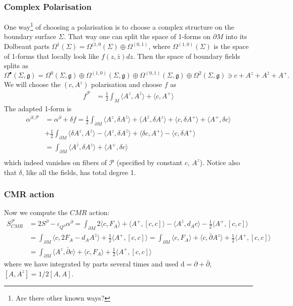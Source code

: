 \documentclass[a4paper,reqno]{amsart}
\newcommand{\g}{\mathfrak{g}}
\newcommand{\calP}{\mathcal{P}}
\newcommand{\de}{\partial}
\newcommand{\dr}{\mathrm{d}}
\begin{document}
\subsubsection{Complex Polarisation}
One way\footnote{Are there other known ways?} of choosing a polarisation is to choose a complex structure on the boundary surface $\Sigma $. That way one can split the space of 1-forms on $\de M$ into its Dolbeaut parts $\Omega^1(\Sigma) = \Omega^{(1,0}(\Sigma) \oplus \Omega^{(0,1)}$, where $\Omega^{(1,0)}(\Sigma)$ is the space of 1-forms that locally look like  $ f(z,\bar{z})dz $. Then the space of boundary fields splits as 
$$ \Omega^{\bullet}(\Sigma,\g) = \Omega^0(\Sigma,\g) \oplus \Omega^{(1,0)}(\Sigma,\g) \oplus \Omega^{(0,1)}(\Sigma,\g) \oplus \Omega^{2}(\Sigma,\g) \ni c + A^z + A^{\bar{z}} + A^+.$$
We will choose the $(c,A^z)$ polarisation and choose $f$ as 
\begin{align*}
f^{\calP} &= \frac{1}{2} \int_M  \langle A^z, A^{\bar{z}} \rangle + \langle c, A^+ \rangle 
\end{align*}
The adapted 1-form is 
\begin{align*} 
\alpha^{\de,\calP} &= \alpha^{\de} + \delta f  = \frac{1}{2} \int_{\de M}\langle A^z,\delta A^{\bar{z}} \rangle + \langle A^{\bar{z}} , \delta A^z \rangle + \langle c, \delta A^+ \rangle + \langle A^+, \delta c \rangle \\
&+ \frac{1}{2}\int_{\de M} \langle \delta A^z, A^{\bar{z}} \rangle - \langle A^z ,\delta A^{\bar{z}} \rangle + \langle \delta c , A^+ \rangle - \langle c, \delta A^+ \rangle \\ 
&= \int_{\de M} \langle A^{\bar{z}} ,\delta A^z \rangle + \langle A^+, \delta c \rangle \\
\end{align*}
which indeed vanishes on fibers of $\calP$ (specified by constant $c$, $A^z$). Notice also that $\delta$, like all the fields, has total degree 1.  
\subsubsection{CMR action}
Now we compute the $CMR$ action: 
\begin{align*} S_{CMR}^{\calP} &= 2S^{\de} - \iota_{Q^{\de}}\alpha^{\de} = \int_{\de M} 2 \langle c, F_A \rangle + \langle A^+ ,[c,c] \rangle  - \langle A^{\bar{z}}, d_Ac \rangle - \frac{1}{2} \langle A^+, [c,c] \rangle \\ 
&= \int_{\de M} \langle c , 2F_A - d_AA^{\bar{z}} \rangle + \frac{1}{2}\langle A^+,[c,c] \rangle  = \int_{\de M} \langle c,F_A\rangle  + \langle c, \bar\partial A^z \rangle + \frac{1}{2} \langle A^+,[c,c] \rangle \\ 
&= \int_{\de M} \langle A^z, \bar\partial c\rangle + \langle c,F_A\rangle + \frac{1}{2} \langle A^+,[c,c] \rangle 
\end{align*}
where we have integrated by parts several times and used $\dr = \partial + \bar\partial$, $[A,A^z] = 1/2 [A,A]$. 
\end{document}
